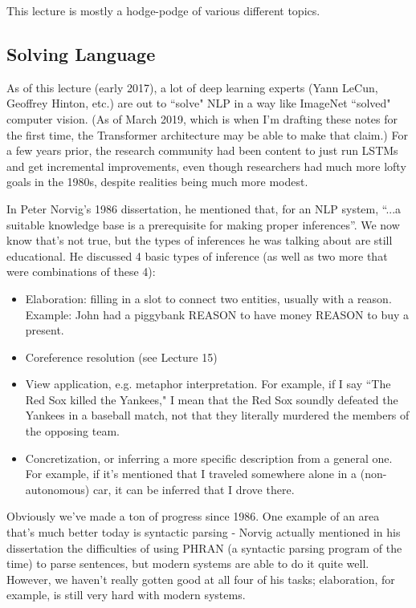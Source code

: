 This lecture is mostly a hodge-podge of various different topics.
\subsection{Solving Language}
As of this lecture (early 2017), a lot of deep learning experts (Yann LeCun, Geoffrey Hinton, etc.) are out to ``solve" NLP in a way like ImageNet ``solved" computer vision. (As of March 2019, which is when I'm drafting these notes for the first time, the Transformer architecture may be able to make that claim.) For a few years prior, the research community had been content to just run LSTMs and get incremental improvements, even though researchers had much more lofty goals in the 1980s, despite realities being much more modest.

In Peter Norvig's 1986 dissertation, he mentioned that, for an NLP system, ``...a suitable knowledge base is a prerequisite for making proper inferences”. We now know that's not true, but the types of inferences he was talking about are still educational. He discussed 4 basic types of inference (as well as two more that were combinations of these 4):
\begin{itemize}
\item Elaboration: filling in a slot to connect two entities, usually with a reason. Example: John had a piggybank REASON to have money REASON to buy a present.
\item Coreference resolution (see Lecture 15)
\item View application, e.g. metaphor interpretation. For example, if I say ``The Red Sox killed the Yankees," I mean that the Red Sox soundly defeated the Yankees in a baseball match, not that they literally murdered the members of the opposing team.
\item Concretization, or inferring a more specific description from a general one. For example, if it's mentioned that I traveled somewhere alone in a (non-autonomous) car, it can be inferred that I drove there.
\end{itemize}
Obviously we've made a ton of progress since 1986. One example of an area that's much better today is syntactic parsing - Norvig actually mentioned in his dissertation the difficulties of using PHRAN (a syntactic parsing program of the time) to parse sentences, but modern systems are able to do it quite well. However, we haven't really gotten good at all four of his tasks; elaboration, for example, is still very hard with modern systems.

